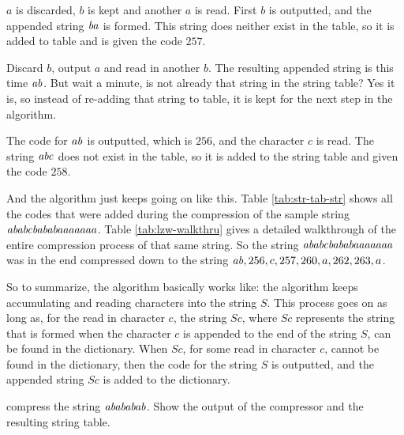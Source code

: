 $a$ is discarded, $b$ is kept and another $a$ is
read. First $b$ is outputted, and the appended string
$\mathit{ba}$ is formed. This string does neither exist in the table,
 so it is added to table and is given the code $257$.

 Discard $b$, output $a$ and read in another $b$. The
 resulting appended string is this time $\mathit{ab}$. But wait a minute,
 is not already that string in the string table? Yes it is, so instead
 of re-adding that string to table, it is kept for the next step in
 the algorithm.

The code for $\mathit{ab}$ is outputted, which is $256$, and the character $c$ is
read. The string $\mathit{abc}$ does not exist in the table, so it is
added to the string table and given the code $258$.

And the algorithm just keeps going on like this. Table
\ref{tab:str-tab-str} shows all the codes that were added during the
compression of the sample string $\mathit{ababcbababaaaaaaa}$. Table
\ref{tab:lzw-walkthru} gives a detailed walkthrough of the entire
compression process of that same string. So the string
$\mathit{ababcbababaaaaaaa}$ was in the end compressed down to the
string $\mathit{ab},256,c,257,260,a,262,263,a$.

So to summarize, the \lzw algorithm basically works like: the algorithm
keeps accumulating and reading characters into the string $S$. This
process goes on as long as, for the read in character $c$, the string
$Sc$, where $Sc$ represents the string that is formed when the
character $c$ is appended to the end of the string $S$, can be found
in the dictionary. When $Sc$, for some read in character $c$, cannot
be found in the dictionary, then the code for the string $S$ is
outputted, and the appended string $Sc$ is added to the dictionary.

\begin{Exercise}[label={lzw-compress}]

  \lzw compress the string $\mathit{abababab}$. Show the output of the
  compressor and the resulting string table.

\end{Exercise}

